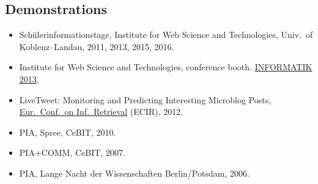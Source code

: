 \documentclass[line,mm]{res}
\newcounter{x}
\newcounter{z}
\begin{document}
\begin{resume}
\section{Demonstrations}
\begin{itemize}
 \item[{[D1]}] 
   Schülerinformationstage, Institute for Web Science and
   Technologies, Univ.\ of Koblenz--Landau, 2011, 2013, 2015, 2016.  
 \item[{[D2]}] Institute for Web Science and Technologies, conference booth.
   \href{http://informatik2013.de}{INFORMATIK 2013}.  
 \item[{[D3]}] 
   LiveTweet: Monitoring and Predicting Interesting Microblog
       Posts, \href{http://ecir2012.upf.edu/}{Eur.\ Conf.\ on Inf.\ Retrieval} (ECIR),
       2012. 
 \item[{[D4]}] PIA, Spree, CeBIT, 2010.
 \item[{[D5]}] 
   PIA+COMM, CeBIT, 2007.
 \item[{[D6]}] PIA, Lange Nacht der Wissenschaften Berlin/Potsdam, 2006. 
\end{itemize}


\end{resume}
\end{document}

